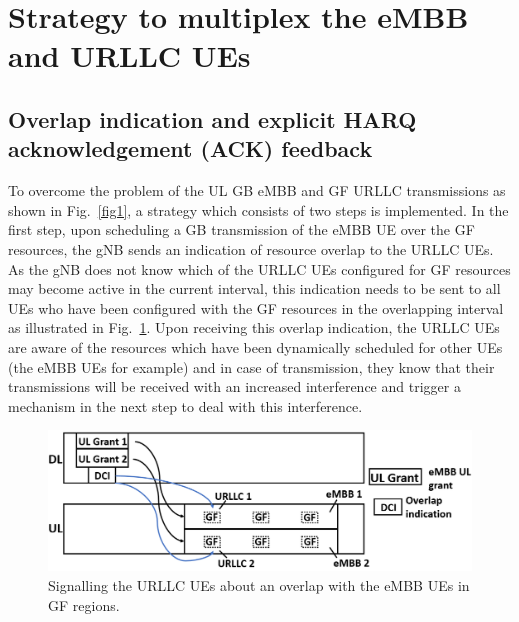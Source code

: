 \documentclass[conference]{IEEEtran}
\begin{document}

\section{Strategy to multiplex the eMBB and URLLC UEs}\label{II}

\subsection{Overlap indication and explicit HARQ acknowledgement (ACK) feedback}\label{IIAA}

To overcome the problem of the UL GB eMBB and GF URLLC transmissions as shown in Fig.~\ref{fig1}, a strategy which consists of two steps is implemented. In the first step, upon scheduling a GB transmission of the eMBB UE over the GF resources, the gNB sends an indication of resource overlap to the URLLC UEs. As the gNB does not know which of the URLLC UEs configured for GF resources may become active in the current interval, this indication needs to be sent to all UEs who have been configured with the GF resources in the overlapping interval as illustrated in Fig.~\ref{fig2}. Upon receiving this overlap indication, the URLLC UEs are aware of the resources which have been dynamically scheduled for other UEs (the eMBB UEs for example) and in case of transmission, they know that their transmissions will be received with an increased interference and trigger a mechanism in the next step to deal with this interference.

\begin{figure}[htbp]
\centerline{\includegraphics[scale=0.22]{fig2.PNG}}
\caption{Signalling the URLLC UEs about an overlap with the eMBB UEs in GF regions.}
\label{fig2}
\vspace{-2mm}
\end{figure}
\end{document}
